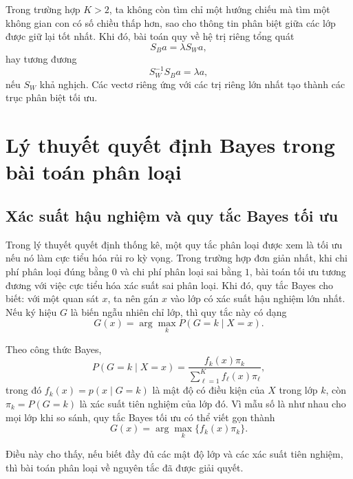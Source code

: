 Trong trường hợp $K>2$, ta không còn tìm chỉ một hướng chiếu mà tìm một không gian con có số chiều thấp hơn, sao cho thông tin phân biệt giữa các lớp được giữ lại tốt nhất. Khi đó, bài toán quy về hệ trị riêng tổng quát
\begin{equation}
S_B a = \lambda S_W a,
\end{equation}
hay tương đương
\begin{equation}
S_W^{-1}S_B a = \lambda a,
\end{equation}
nếu $S_W$ khả nghịch. Các vectơ riêng ứng với các trị riêng lớn nhất tạo thành các trục phân biệt tối ưu.

\section{Lý thuyết quyết định Bayes trong bài toán phân loại}

\subsection{Xác suất hậu nghiệm và quy tắc Bayes tối ưu}

Trong lý thuyết quyết định thống kê, một quy tắc phân loại được xem là tối ưu nếu nó làm cực tiểu hóa rủi ro kỳ vọng. Trong trường hợp đơn giản nhất, khi chi phí phân loại đúng bằng $0$ và chi phí phân loại sai bằng $1$, bài toán tối ưu tương đương với việc cực tiểu hóa xác suất sai phân loại. Khi đó, quy tắc Bayes cho biết: với một quan sát $x$, ta nên gán $x$ vào lớp có xác suất hậu nghiệm lớn nhất. Nếu ký hiệu $G$ là biến ngẫu nhiên chỉ lớp, thì quy tắc này có dạng
\begin{equation}
G(x)=\arg\max_k P(G=k\mid X=x).
\end{equation}

Theo công thức Bayes,
\begin{equation}
P(G=k\mid X=x)=\frac{f_k(x)\pi_k}{\sum_{\ell=1}^{K}f_\ell(x)\pi_\ell},
\end{equation}
trong đó $f_k(x)=p(x\mid G=k)$ là mật độ có điều kiện của $X$ trong lớp $k$, còn $\pi_k=P(G=k)$ là xác suất tiên nghiệm của lớp đó. Vì mẫu số là như nhau cho mọi lớp khi so sánh, quy tắc Bayes tối ưu có thể viết gọn thành
\begin{equation}
G(x)=\arg\max_k \{f_k(x)\pi_k\}.
\end{equation}

Điều này cho thấy, nếu biết đầy đủ các mật độ lớp và các xác suất tiên nghiệm, thì bài toán phân loại về nguyên tắc đã được giải quyết.

